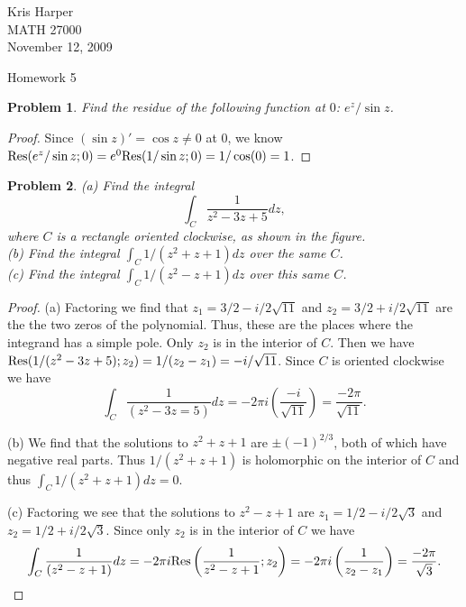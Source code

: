 \documentclass{article}
\newtheorem{problem}{Problem}
\newcommand{\res}{\textup{Res}}
\begin{document}
\begin{flushright}
Kris Harper\\

MATH 27000\\

November 12, 2009
\end{flushright}

\begin{center}
Homework 5
\end{center}

\begin{problem}
\label{sinresidue}
Find the residue of the following function at $0$: $e^z/\sin z$.
\end{problem}
\begin{proof}
Since $(\sin z)' = \cos z \neq 0$ at $0$, we know $\res(e^z/\sin z ; 0) = e^0 \res(1/\sin z ; 0) = 1/\cos (0) = 1$.
\end{proof}

\begin{problem}
(a) Find the integral
\[
\int_C \frac{1}{z^2 - 3z + 5}dz,
\]
where $C$ is a rectangle oriented clockwise, as shown in the figure.\\
(b) Find the integral $\int_C 1/(z^2 + z + 1) dz$ over the same $C$.\\
(c) Find the integral $\int_C 1/(z^2 - z + 1) dz$ over this same $C$.
\end{problem}
\begin{proof}
(a) Factoring we find that $z_1 = 3/2 - i/2 \sqrt{11}$ and $z_2 = 3/2 + i/2 \sqrt{11}$ are the the two zeros of the polynomial. Thus, these are the places where the integrand has a simple pole. Only $z_2$ is in the interior of $C$. Then we have $\res(1/(z^2-3z+5) ; z_2) = 1/(z_2-z_1) = -i/\sqrt{11}$. Since $C$ is oriented clockwise we have
\[
\int_C \frac{1}{(z^2-3z=5)}dz = -2 \pi i \left ( \frac{-i}{\sqrt{11}} \right ) = \frac{-2 \pi}{\sqrt{11}}.
\]

(b) We find that the solutions to $z^2 + z + 1$ are $\pm(-1)^{2/3}$, both of which have negative real parts. Thus $1/(z^2+z+1)$ is holomorphic on the interior of $C$ and thus $\int_C 1/(z^2 + z + 1)dz = 0$.

(c) Factoring we see that the solutions to $z^2 - z + 1$ are $z_1 = 1/2 - i/2\sqrt{3}$ and $z_2 = 1/2 + i/2 \sqrt{3}$. Since only $z_2$ is in the interior of $C$ we have
\[
\int_C \frac{1}{(z^2 - z + 1)}dz = -2 \pi i \res \left (\frac{1}{z^2 - z + 1} ; z_2 \right ) = -2 \pi i \left (\frac{1}{z_2-z_1} \right ) = \frac{-2 \pi}{\sqrt{3}}.
\]
\end{proof}
\end{document}
